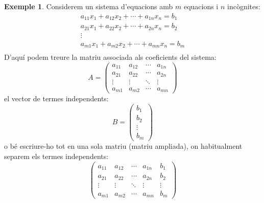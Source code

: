 \documentclass[a4paper,12pt,twoside]{article}
\newcommand{\1}{\mathbf{1}}
\newcommand{\0}{\mathbf{0}}
\theoremstyle{definition}
\newtheorem{exemple}[teorema]{Exemple}
\theoremstyle{remark}
\begin{document}
\begin{exemple}
	Considerem un sistema d'equacions amb $m$ equacions i $n$ incògnites:
	$$
	\begin{matrix}
		a_{11}x_1+a_{12}x_2+ \cdots + a_{1n}x_n = b_1 \\
		a_{21}x_1+a_{22}x_2+ \cdots + a_{2n}x_n = b_2 \\
		\vdots \\
		a_{m1}x_1+a_{m2}x_2+ \cdots + a_{mn}x_n = b_m \\
	\end{matrix}
	$$
	D'aquí podem treure la matriu associada als coeficients del sistema:
	$$A=
	\left(\begin{array}{cccc}
	a_{11} & a_{12} & \cdots & a_{1n} \\
	a_{21} & a_{22} & \cdots & a_{2n} \\
	\vdots & \vdots & \ddots & \vdots \\
	a_{m1} & a_{m2} & \cdots & a_{mn} 
	\end{array}\right)
	$$
	el vector de termes independents:
	$$B=
	\begin{pmatrix}
	b_1 \\ b_2 \\ \vdots \\ b_m
	\end{pmatrix}
	$$
	o bé escriure-ho tot en una sola matriu (matriu ampliada), on habitualment separem els termes independents:
	$$
	\left(\begin{array}{cccc|c}
	a_{11} & a_{12} & \cdots & a_{1n} & b_1 \\
	a_{21} & a_{22} & \cdots & a_{2n} & b_2 \\
	\vdots & \vdots & \ddots & \vdots & \vdots \\
	a_{m1} & a_{m2} & \cdots & a_{mn} & b_m 
	\end{array}\right)
	$$
\end{exemple}
\end{document}
